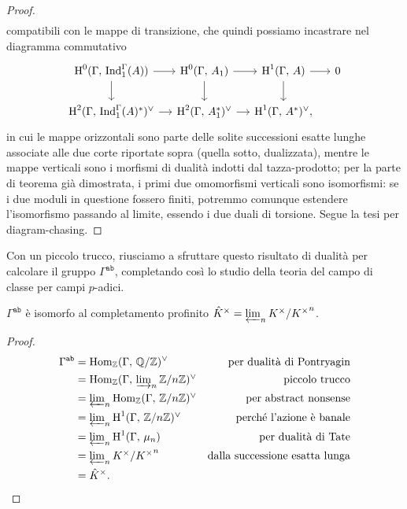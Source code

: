 \begin{proof}
\begin{align*}
	\end{align*}
	compatibili con le mappe di transizione, che quindi possiamo incastrare nel diagramma commutativo
	\[\begin{tikzcd}[column sep = small]
	\HH^0(\Gamma, \, \Ind_1^\Gamma(A)) \rar\dar
	& \HH^0(\Gamma, \, A_1) \rar\dar
	& \HH^1(\Gamma, \, A) \rar\dar
	& 0 \\
	\HH^2(\Gamma, \, \Ind_1^\Gamma(A)^*)^\vee \rar
	& \HH^2(\Gamma, \, A_1^*)^\vee \rar
	& \HH^1(\Gamma, \, A^*)^\vee,
	&
	\end{tikzcd}  \]
	in cui le mappe orizzontali sono parte delle solite successioni esatte lunghe associate alle due corte riportate sopra (quella sotto, dualizzata), mentre le mappe verticali sono i morfismi di dualità indotti dal tazza-prodotto; per la parte di teorema già dimostrata, i primi due omomorfismi verticali sono isomorfismi: se i due moduli in questione fossero finiti, potremmo comunque estendere l'isomorfismo passando al limite, essendo i due duali di torsione. Segue la tesi per diagram-chasing.
\end{proof}

\pagebreak
Con un piccolo trucco, riusciamo a sfruttare questo risultato di dualità per calcolare il gruppo $ \Gamma^\texttt{ab} $, completando così lo studio della teoria del campo di classe per campi $ p $-adici.


\begin{corollary}
	$ \Gamma^\mathtt{ab} $ è isomorfo al completamento profinito $ \hat{K}^\times = \varprojlim_n K^\times/ {K^\times}^n $.
\end{corollary}
\begin{proof}
	\begin{align*}
	\Gamma^\mathtt{ab}
	& = \operatorname{Hom}_{\mathbb{Z}}(\Gamma,\, \mathbb{Q}/\mathbb{Z})^\vee & \text{per dualità di Pontryagin} \\[0.1em]
	& = \operatorname{Hom}_{\mathbb{Z}}(\Gamma,\, \textstyle\varinjlim_n \mathbb{Z}/n\mathbb{Z})^\vee & \text{piccolo trucco}\\ 
	& = \textstyle\varprojlim_n \operatorname{Hom}_{\mathbb{Z}}(\Gamma,\, \mathbb{Z}/n\mathbb{Z})^\vee & \text{per abstract nonsense} \\
	& = \textstyle\varprojlim_n \operatorname{H}^1(\Gamma,\, \mathbb{Z}/n\mathbb{Z})^\vee & \text{perché l'azione è banale} \\
	& = \textstyle\varprojlim_n \operatorname{H}^1(\Gamma,\, \mu_n) & \text{per dualità di Tate} \\
	& = \textstyle\varprojlim_n K^\times / {K^\times}^n & \text{dalla successione esatta lunga} \\
	& = \hat{K}^\times. 
	\end{align*}
\end{proof}
